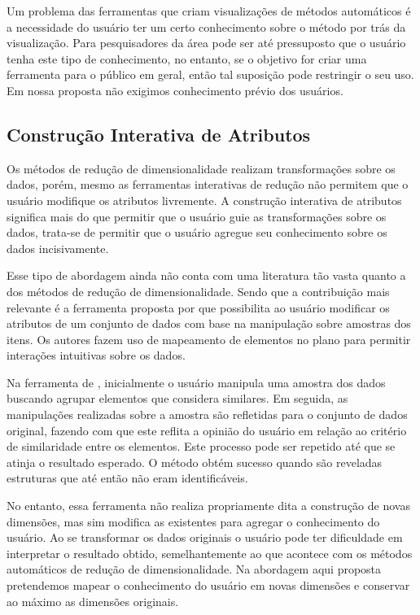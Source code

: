 Um problema das ferramentas que criam visualizações de
métodos automáticos é a necessidade do usuário ter um certo
conhecimento sobre o método por trás da visualização. Para
pesquisadores da área pode ser até pressuposto que o usuário
tenha este tipo de conhecimento, no entanto, se o objetivo
for criar uma ferramenta para o público em geral, então tal
suposição pode restringir o seu uso. Em nossa proposta não
exigimos conhecimento prévio dos usuários.

\subsection{Construção Interativa de Atributos}\label{sec:tr}

Os métodos de redução de dimensionalidade realizam
transformações sobre os dados, porém, mesmo as ferramentas
interativas de redução não permitem que o usuário modifique
os atributos livremente. A construção interativa de
atributos significa mais do que permitir que o usuário guie
as transformações sobre os dados, trata-se de permitir que o
usuário agregue seu conhecimento sobre os dados
incisivamente.

Esse tipo de abordagem ainda não conta com uma literatura
tão vasta quanto a dos métodos de redução de
dimensionalidade. Sendo que a contribuição mais relevante é a
ferramenta proposta por \citet{Gladys2013} que possibilita ao
usuário modificar os atributos de um conjunto de dados com
base na manipulação sobre amostras dos itens. Os autores
fazem uso de mapeamento de elementos no plano para permitir
interações intuitivas sobre os dados. 

Na ferramenta de \citet{Gladys2013}, inicialmente o
usuário manipula uma amostra dos dados buscando  agrupar
elementos que considera similares. Em seguida, as
manipulações realizadas sobre a amostra são refletidas para
o conjunto de dados original, fazendo com que este reflita a
opinião do usuário em relação ao critério de similaridade
entre os elementos. Este processo pode ser repetido até que
se atinja o resultado esperado. O método obtém sucesso
quando são reveladas estruturas que até então não eram
identificáveis.

No entanto, essa ferramenta não realiza propriamente dita a
construção de novas dimensões, mas sim modifica as
existentes para agregar o conhecimento do usuário. Ao se
transformar os dados originais o usuário pode ter
dificuldade em interpretar o resultado obtido,
semelhantemente ao que acontece com os métodos automáticos
de redução de dimensionalidade.  Na abordagem aqui proposta
pretendemos mapear o conhecimento do usuário em novas
dimensões e conservar ao máximo as dimensões originais.

